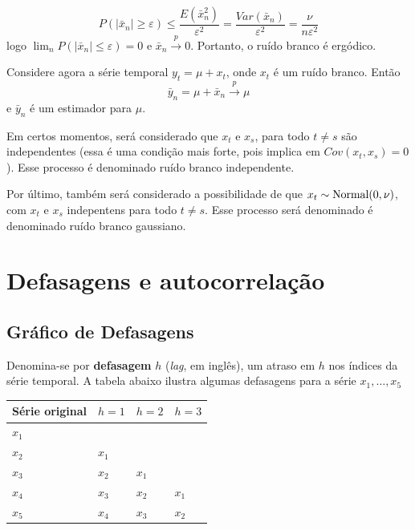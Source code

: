 \documentclass[
  letterpaper,
  DIV=11,
  numbers=noendperiod]{scrreprt}
\theoremstyle{definition}
\theoremstyle{plain}
\theoremstyle{definition}
\theoremstyle{remark}
\begin{document}
\[P\left(|\bar{x}_n|\geq\varepsilon\right)\leq \frac{E(\bar{x}_n^2)}{\varepsilon^2}=\frac{Var(\bar{x}_n)}{\varepsilon^2}=\frac{\nu}{n\varepsilon^2}\]
logo \(\lim_{n}P(|\bar{x}_n|\leq \varepsilon)=0\) e
\(\bar{x}_n\stackrel{p}{\rightarrow}0\). Portanto, o ruído branco é
ergódico.

Considere agora a série temporal \(y_t=\mu+x_t\), onde \(x_t\) é um
ruído branco. Então
\[\bar{y}_n=\mu+\bar{x}_n\stackrel{p}{\rightarrow}\mu\] e \(\bar{y}_n\)
é um estimador para \(\mu\).

Em certos momentos, será considerado que \(x_t\) e \(x_s\), para todo
\(t\neq s\) são independentes (essa é uma condição mais forte, pois
implica em \(Cov(x_t,x_s)=0\)). Esse processo é denominado ruído branco
independente.

Por último, também será considerado a possibilidade de que
\(x_t\sim\hbox{Normal}(0,\nu)\), com \(x_t\) e \(x_s\) indepentens para
todo \(t\neq s\). Esse processo será denominado é denominado ruído
branco gaussiano.


\hypertarget{defasagens-e-autocorrelauxe7uxe3o}{%
\chapter{Defasagens e
autocorrelação}\label{defasagens-e-autocorrelauxe7uxe3o}}

\hypertarget{gruxe1fico-de-defasagens}{%
\section{Gráfico de Defasagens}\label{gruxe1fico-de-defasagens}}

Denomina-se por \textbf{defasagem} \(h\) (\emph{lag}, em inglês), um
atraso em \(h\) nos índices da série temporal. A tabela abaixo ilustra
algumas defasagens para a série \(x_1,\ldots,x_5\)

\begin{longtable}[]{@{}llll@{}}
\toprule\noalign{}
Série original & \(h=1\) & \(h=2\) & \(h=3\) \\
\midrule\noalign{}
\endhead
\bottomrule\noalign{}
\endlastfoot
\(x_1\) & & & \\
\(x_2\) & \(x_1\) & & \\
\(x_3\) & \(x_2\) & \(x_1\) & \\
\(x_4\) & \(x_3\) & \(x_2\) & \(x_1\) \\
\(x_5\) & \(x_4\) & \(x_3\) & \(x_2\) \\
\end{longtable}
\end{document}
